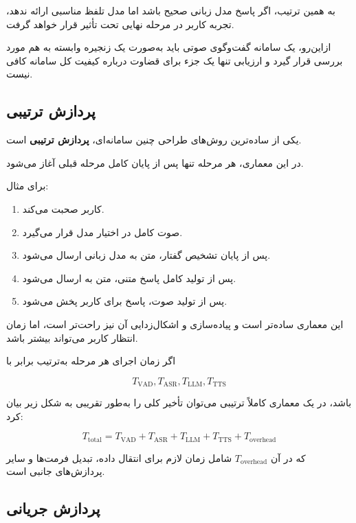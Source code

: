 به همین ترتیب، اگر پاسخ مدل زبانی صحیح باشد اما مدل 
تلفظ مناسبی ارائه ندهد، تجربه کاربر در مرحله نهایی تحت تأثیر
قرار خواهد گرفت.

ازاین‌رو، یک سامانه گفت‌وگوی صوتی باید به‌صورت یک زنجیره
وابسته به هم مورد بررسی قرار گیرد و ارزیابی تنها یک جزء برای
قضاوت درباره کیفیت کل سامانه کافی نیست.


\subsection{پردازش ترتیبی}

یکی از ساده‌ترین روش‌های طراحی چنین سامانه‌ای،
\textbf{پردازش ترتیبی}
است.

در این معماری، هر مرحله تنها پس از پایان کامل مرحله قبلی آغاز
می‌شود.

برای مثال:

\begin{enumerate}
    \item کاربر صحبت می‌کند.
    \item صوت کامل در اختیار مدل  قرار می‌گیرد.
    \item پس از پایان تشخیص گفتار، متن به مدل زبانی ارسال می‌شود.
    \item پس از تولید کامل پاسخ متنی، متن به  ارسال می‌شود.
    \item پس از تولید صوت، پاسخ برای کاربر پخش می‌شود.
\end{enumerate}

این معماری ساده‌تر است و پیاده‌سازی و اشکال‌زدایی آن نیز
راحت‌تر است، اما زمان انتظار کاربر می‌تواند بیشتر باشد.

اگر زمان اجرای هر مرحله به‌ترتیب برابر با

\[
T_{\mathrm{VAD}},
T_{\mathrm{ASR}},
T_{\mathrm{LLM}},
T_{\mathrm{TTS}}
\]

باشد، در یک معماری کاملاً ترتیبی می‌توان تأخیر کلی را به‌طور
تقریبی به شکل زیر بیان کرد:

\begin{equation}
T_{\mathrm{total}}
=
T_{\mathrm{VAD}}
+
T_{\mathrm{ASR}}
+
T_{\mathrm{LLM}}
+
T_{\mathrm{TTS}}
+
T_{\mathrm{overhead}}
\end{equation}

که در آن $T_{\mathrm{overhead}}$ شامل زمان لازم برای انتقال داده،
تبدیل فرمت‌ها و سایر پردازش‌های جانبی است.


\subsection{پردازش جریانی}

